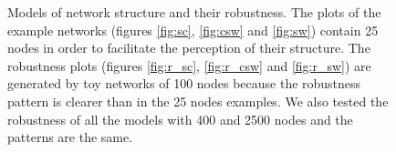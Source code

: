 \begin{landscape}
\begin{figure}[p]
\caption[Models of network structure and their robustness.]{Models of network structure and their robustness. The plots of the example networks (figures \ref{fig:sc}, \ref{fig:csw} and \ref{fig:sw}) contain 25 nodes in order to facilitate the perception of their structure. The robustness plots (figures \ref{fig:r_sc}, \ref{fig:r_csw} and \ref{fig:r_sw}) are generated by toy networks of 100 nodes because the robustness pattern is clearer than in the 25 nodes examples. We also tested the robustness of all the models with 400 and 2500 nodes and the patterns are the same.}
\label{fig:models}
\end{figure}
\end{landscape}

